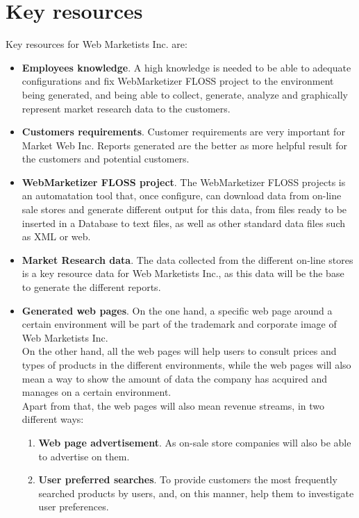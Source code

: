 \documentclass[11pt]{article}
\begin{document}
\section{Key resources}
Key resources for Web Marketists Inc. are:
\begin{itemize}
\item{\textbf{Employees knowledge}}. A high knowledge is needed to be able to adequate configurations and fix WebMarketizer FLOSS project to the environment being generated, and being able to collect, generate, analyze and graphically represent market research data to the customers.
\item{\textbf{Customers requirements}}. Customer requirements are very important for Market Web Inc. Reports generated are the better as more helpful result for the customers and potential customers.
\item{\textbf{WebMarketizer FLOSS project}}. The WebMarketizer FLOSS projects is an automatation tool that, once configure, can download data from on-line sale stores and generate different output for this data, from files ready to be inserted in a Database to text files, as well as other standard data files such as XML or web.
\item{\textbf{Market Research data}}. The data collected from the different on-line stores is a key resource data for Web Marketists Inc., as this data will be the base to generate the different reports.
\item{\textbf{Generated web pages}}. On the one hand, a specific web page around a certain environment will be part of the trademark and corporate image of Web Marketists Inc.\\
On the other hand, all the web pages will help users to consult prices and types of products in the different environments, while the web pages will also mean a way to show the amount of data the company has acquired and manages on a certain environment.\\
Apart from that, the web pages will also mean revenue streams, in two different ways:
\begin{enumerate}
\item{\textbf{Web page advertisement}}. As on-sale store companies will also be able to advertise on them.
\item{\textbf{User preferred searches}}. To provide customers the most frequently searched products by users, and, on this manner, help them to investigate user preferences.
\end{enumerate}
\end{itemize}
\end{document}
